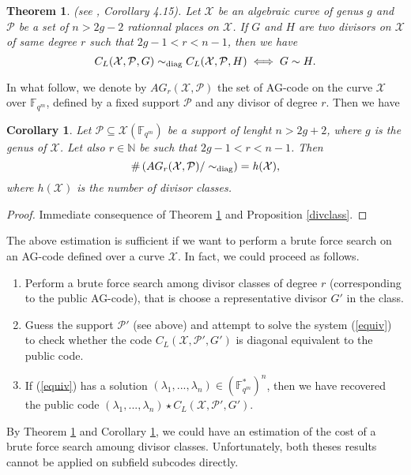 \documentclass[10pt]{article}
\newtheorem{thm}{Theorem}[]
\newtheorem{coro1}{Corollary}[]
\newcommand{\s}{\vspace{0.3cm}}
\newcommand{\N}{\mathbb{N}}
\newcommand{\fqm}{\mathbb{F}_{q^m}}
\newcommand{\su}{\subseteq}
\newcommand{\X}{\mathcal{X}}
\newcommand{\PR}{\mathcal{P}}
\begin{document}
\s

\begin{thm} \label{thmequiv} \rm (see \cite{CMRP}, Corollary 4.15). \it
Let $\X$ be an algebraic curve of genus $g$ and $\PR$ be a set of $n>2g-2$ rationnal places on $\X$. If $G$ and $H$ are two divisors on $\X$ of same degree $r$ such that $2g-1 < r < n-1$, then we have 
\[C_L(\X,\PR,G) \sim_{\rm diag} C_L(\X,\PR,H) \iff G \sim H.\]
\end{thm}

\s

In what follow, we denote by $AG_r(\X,\PR)$ the set of AG-code on the curve $\X$ over $\fqm$, defined by a fixed support $\PR$ and any divisor of degree $r$. Then we have 

\s

\begin{coro1} \label{nbAGr}
Let $\PR \su \X(\fqm)$ be a support of lenght $n > 2g+2$, where $g$ is the genus of $\X$. Let also $r \in \N$ be such that $2g-1 < r < n-1$. Then 
\[ \#\left(AG_r(\X,\PR)/ \sim_{\rm diag}\right) \it = h(\X),\]
where $h(\X)$ is the number of divisor classes.
\end{coro1}

\s

\begin{proof}
Immediate consequence of Theorem \ref{thmequiv} and Proposition \ref{divclass}.
\end{proof}

\s

The above estimation is sufficient if we want to perform a brute force search on an AG-code defined over a curve $\X$. In fact, we could proceed as follows.
\begin{enumerate}
\item Perform a brute force search among divisor classes of degree $r$ (corresponding to the public AG-code), that is choose a representative divisor $G'$ in the class.
\item Guess the support $\PR'$ (see above) and attempt to solve the system (\ref{equiv}) to check whether the code $C_L(\X,\PR',G')$ is diagonal equivalent to the public code.
\item If (\ref{equiv}) has a solution $(\lambda_1,...,\lambda_n) \in (\fqm^*)^n$, then we have recovered the public code $(\lambda_1,...,\lambda_n) \star C_L(\X,\PR',G')$.
\end{enumerate}

By Theorem \ref{thmequiv} and Corollary \ref{nbAGr}, we could have an estimation of the cost of a brute force search amoung divisor classes. Unfortunately, both theses results cannot be applied on subfield subcodes directly.
\end{document}
